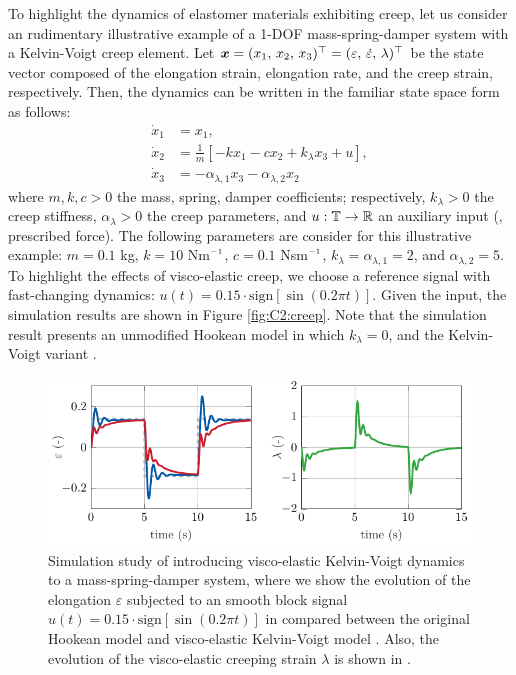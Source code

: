 \begin{example} To highlight the dynamics of elastomer materials exhibiting creep, let us consider an rudimentary illustrative example of a 1-DOF mass-spring-damper system with a Kelvin-Voigt creep element. Let ${\boldsymbol{x}} = (x_1,\,x_2,\,x_3)^\top = (\varepsilon,\, \dot{\varepsilon},\, \lambda)^\top$ be the state vector composed of the elongation strain, elongation rate, and the creep strain, respectively. Then, the dynamics can be written in the familiar state space form as follows:
%
\begin{align}
\dot{x}_1 & = x_1, \\
\dot{x}_2 & = \frac{1}{m}\left[ -k x_1 - c x_2 + k_\lambda x_3 + u \right], \\
\dot{x}_3 & = -\alpha_{\lambda,1}x_3 -\alpha_{\lambda,2}x_2
\end{align}
%
where $m,k,c>0$  the mass, spring, damper coefficients; respectively, $k_{\lambda}>0$ the creep stiffness, $\alpha_{\lambda}>0$ the creep parameters, and $u: \mathbb{T} \to \mathbb{R}$ an auxiliary input (\ie, prescribed force). The following parameters are consider for this illustrative example: $m = 0.1$ \si{\kilo \gram}, $k = 10$ Nm$\inv$, $c = 0.1$ Nsm$\inv$, $k_{\lambda} = \alpha_{\lambda,1} = 2$, and $\alpha_{\lambda,2} = 5$.  To highlight the effects of visco-elastic creep, we choose a reference signal with fast-changing dynamics: $u(t) = 0.15\cdot \textrm{sign}\left[ \sin(0.2\pi t) \right]$. Given the input, the simulation results are shown in Figure \ref{fig:C2:creep}. Note that the simulation result presents an unmodified Hookean model  in which $k_\lambda = 0$, and the Kelvin-Voigt variant .
%
\begin{figure}[!h]
   \includegraphics*{./pdf/thesis-figure-4-10.pdf}
   \vspace{-0.2cm}
   \caption{Simulation study of introducing visco-elastic Kelvin-Voigt dynamics to a mass-spring-damper system, where we show the evolution of the elongation $\varepsilon$ subjected to an smooth block signal $u(t) = 0.15\cdot \textrm{sign}\left[ \sin(0.2\pi t) \right]$ in  compared between the original Hookean model  and visco-elastic Kelvin-Voigt model . Also, the evolution of the visco-elastic creeping strain $\lambda$ is shown in .}

\end{figure}
\end{example}
